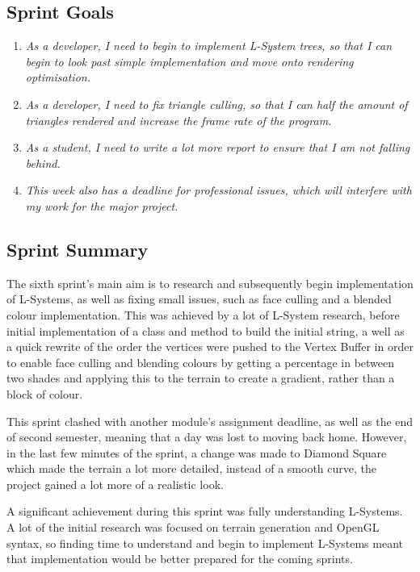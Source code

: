 \documentclass[a4paper,10pt]{report}
\begin{document}
\subsection{Sprint Goals}

\begin{enumerate}
    \item \textit{As a developer, I need to begin to implement L-System trees, so that I can begin to look past simple implementation and move onto rendering optimisation.  }
    \item \textit{As a developer, I need to fix triangle culling, so that I can half the amount of triangles rendered and increase the frame rate of the program.}
    \item \textit{As a student, I need to write a lot more report to ensure that I am not falling behind. }
    \item \textit{This week also has a deadline for professional issues, which will interfere with my work for the major project.}
    
\end{enumerate}
\subsection{Sprint Summary}

The sixth sprint's main aim is to research and subsequently begin implementation of L-Systems, as well as fixing small issues, such as face culling and a blended colour implementation. This was achieved by a lot of L-System research, before initial implementation of a class and method to build the initial string, a well as a quick rewrite of the order the vertices were pushed to the Vertex Buffer in order to enable face culling and blending colours by getting a percentage in between two shades and applying this to the terrain to create a gradient, rather than a block of colour. \medskip

This sprint clashed with another module's assignment deadline, as well as the end of second semester, meaning that a day was lost to moving back home. However, in the last few minutes of the sprint, a change was made to Diamond Square which made the terrain a lot more detailed, instead of a smooth curve, the project gained a lot more of a realistic look. \medskip

A significant achievement during this sprint was fully understanding L-Systems. A lot of the initial research was focused on terrain generation and OpenGL syntax, so finding time to understand and begin to implement L-Systems meant that implementation would be better prepared for the coming sprints. \clearpage
\end{document}
